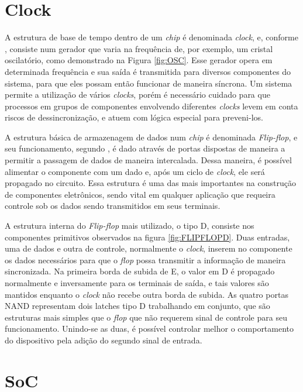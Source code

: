 \documentclass[
	12pt,				%
    oneside,			%
	a4paper,			%
	english,			%
	french,				%
	spanish,			%
	brazil				%
	]{abntex2}
\begin{document}
\section{Clock}

A estrutura de base de tempo dentro de um \textit{chip} é denominada \textit{clock}, e, conforme \citeauthor{Masami}, consiste num gerador que varia na frequência de, por exemplo, um cristal oscilatório, como demonstrado na Figura \ref{fig:OSC}. Esse gerador opera em determinada frequência e sua saída é transmitida para diversos componentes do sistema, para que eles possam então funcionar de maneira síncrona. Um sistema permite a utilização de vários \textit{clocks}, porém é necessário cuidado para que processos em grupos de componentes envolvendo diferentes \textit{clocks} levem em conta riscos de dessincronização, e atuem com lógica especial para preveni-los.



A estrutura básica de armazenagem de dados num \textit{chip} é denominada \textit{Flip-flop}, e seu funcionamento, segundo \citeauthor{Mano}, é dado através de portas dispostas de maneira a permitir a passagem de dados de maneira intercalada. Dessa maneira, é possível alimentar o componente com um dado e, após um ciclo de \textit{clock}, ele será propagado no circuito. Essa estrutura é uma das mais importantes na construção de componentes eletrônicos, sendo vital em qualquer aplicação que requeira controle sob os dados sendo transmitidos em seus terminais.


A estrutura interna do \textit{Flip-flop} mais utilizado, o tipo D, consiste nos componentes primitivos observados na figura \ref{fig:FLIPFLOPD}. Duas entradas, uma de dados e outra de controle, normalmente o \textit{clock}, inserem no componente os dados necessários para que o \textit{flop} possa transmitir a informação de maneira sincronizada. Na primeira borda de subida de E, o valor em D é propagado normalmente e inversamente para os terminais de saída, e tais valores são mantidos enquanto o \textit{clock} não recebe outra borda de subida. As quatro portas NAND representam dois latches tipo D trabalhando em conjunto, que são estruturas mais simples que o \textit{flop} que não requerem sinal de controle para seu funcionamento. Unindo-se as duas, é possível controlar melhor o comportamento do dispositivo pela adição do segundo sinal de entrada.

\section{SoC}
\end{document}
